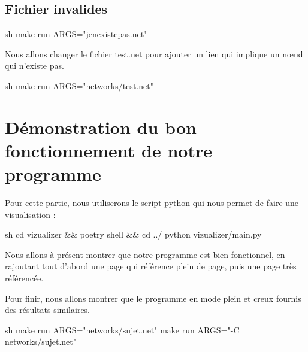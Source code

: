 \documentclass{NewTeX}
\begin{document}
\subsection{Fichier invalides}

\begin{code}{sh}
make run ARGS="jenexistepas.net"
\end{code}

Nous allons changer le fichier test.net pour ajouter un lien qui implique un nœud qui n'existe pas.

\begin{code}{sh}
make run ARGS="networks/test.net"
\end{code}


\section{Démonstration du bon fonctionnement de notre programme}

Pour cette partie, nous utiliserons le script python qui nous permet de faire une visualisation :

\begin{code}{sh}
cd vizualizer && poetry shell && cd ../
python vizualizer/main.py
\end{code}

Nous allons à présent montrer que notre programme est bien fonctionnel, en rajoutant tout d'abord une page qui référence plein de page, puis une page très référencée.

Pour finir, nous allons montrer que le programme en mode plein et creux fournis des résultats similaires.
\begin{code}{sh}
make run ARGS="networks/sujet.net"
make run ARGS="-C networks/sujet.net"
\end{code}
\end{document}
